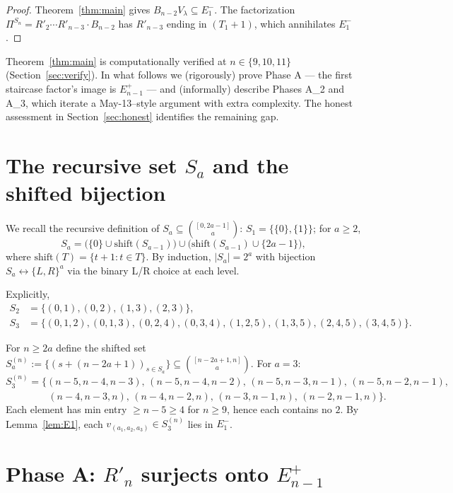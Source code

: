 \documentclass[11pt]{article}
\theoremstyle{definition}
\begin{document}
\begin{proof}
Theorem~\ref{thm:main} gives $B_{n-2}V_\lambda\subseteq E_1^-$.
The factorization $\Pi^{S_n}=R'_2\cdots R'_{n-3}\cdot B_{n-2}$
has $R'_{n-3}$ ending in $(T_1{+}1)$, which annihilates $E_1^-$.
\end{proof}

Theorem~\ref{thm:main} is computationally verified at $n\in\{9,10,11\}$
(Section~\ref{sec:verify}).  In what follows we (rigorously) prove
Phase A --- the first staircase factor's image is $E_{n-1}^+$ ---
and (informally) describe Phases A_2 and A_3, which iterate a
May-13--style argument with extra complexity.  The honest assessment
in Section~\ref{sec:honest} identifies the remaining gap.

\section{The recursive set $S_a$ and the shifted bijection}\label{sec:S3}

We recall the recursive definition of $S_a\subseteq\binom{[0,2a-1]}{a}$:
$S_1=\{\{0\},\{1\}\}$; for $a\ge 2$,
\[
   S_a=\big(\{0\}\cup\mathrm{shift}(S_{a-1})\big)\cup
       \big(\mathrm{shift}(S_{a-1})\cup\{2a{-}1\}\big),
\]
where $\mathrm{shift}(T)=\{t{+}1:t\in T\}$.  By induction,
$|S_a|=2^a$ with bijection $S_a\leftrightarrow\{L,R\}^a$ via the
binary L/R choice at each level.

Explicitly,
\begin{align*}
   S_2&=\{(0,1),(0,2),(1,3),(2,3)\},\\
   S_3&=\{(0,1,2),(0,1,3),(0,2,4),(0,3,4),
          (1,2,5),(1,3,5),(2,4,5),(3,4,5)\}.
\end{align*}

For $n\ge 2a$ define the shifted set
$S_a^{(n)}:=\{(s+(n{-}2a{+}1))_{s\in S_a}\}\subseteq
\binom{[n{-}2a{+}1,n]}{a}$.  For $a=3$:
\[
   S_3^{(n)}=\Big\{
   (n{-}5,n{-}4,n{-}3),\,(n{-}5,n{-}4,n{-}2),\,
   (n{-}5,n{-}3,n{-}1),\,(n{-}5,n{-}2,n{-}1),
\]
\[
   \phantom{S_3^{(n)}=\Big\{}\,
   (n{-}4,n{-}3,n),\,(n{-}4,n{-}2,n),\,
   (n{-}3,n{-}1,n),\,(n{-}2,n{-}1,n)\Big\}.
\]
Each element has min entry $\ge n-5\ge 4$ for $n\ge 9$, hence
each contains no $2$.  By Lemma~\ref{lem:E1}, each
$v_{(a_1,a_2,a_3)}\in S_3^{(n)}$ lies in $E_1^-$.

\section{Phase A: $R'_n$ surjects onto $E_{n-1}^+$}\label{sec:phaseA}
\end{document}
